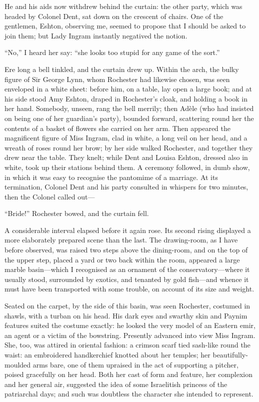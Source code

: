 He and his aids now withdrew behind the curtain: the other party, which
was headed by Colonel Dent, sat down on the crescent of chairs. One of
the gentlemen, \Mr{} Eshton, observing me, seemed to propose that I should
be asked to join them; but Lady Ingram instantly negatived the notion.

\enquote{No,} I heard her say: \enquote{she looks too stupid for any
game of the sort.}

Ere long a bell tinkled, and the curtain drew up. Within the arch, the
bulky figure of Sir George Lynn, whom \Mr{} Rochester had likewise chosen,
was seen enveloped in a white sheet: before him, on a table, lay open a
large book; and at his side stood Amy Eshton, draped in \Mr{} Rochester's
cloak, and holding a book in her hand. Somebody, unseen, rang the bell
merrily; then Adèle (who had insisted on being one of her guardian's
party), bounded forward, scattering round her the contents of a basket
of flowers she carried on her arm. Then appeared the magnificent figure
of Miss Ingram, clad in white, a long veil on her head, and a wreath of
roses round her brow; by her side walked \Mr{} Rochester, and together
they drew near the table. They knelt; while \Mrs{} Dent and Louisa
Eshton, dressed also in white, took up their stations behind them. A
ceremony followed, in dumb show, in which it was easy to recognise the
pantomime of a marriage. At its termination, Colonel Dent and his party
consulted in whispers for two minutes, then the Colonel called out---

\enquote{Bride!} \Mr{} Rochester bowed, and the curtain fell.

A considerable interval elapsed before it again rose. Its second rising
displayed a more elaborately prepared scene than the last. The
drawing-room, as I have before observed, was raised two steps above the
dining-room, and on the top of the upper step, placed a yard or two back
within the room, appeared a large marble basin---which I recognised as
an ornament of the conservatory---where it usually stood, surrounded by
exotics, and tenanted by gold fish---and whence it must have been
transported with some trouble, on account of its size and weight.

Seated on the carpet, by the side of this basin, was seen \Mr{} Rochester,
costumed in shawls, with a turban on his head. His dark eyes and
swarthy skin and Paynim features suited the costume exactly: he looked
the very model of an Eastern emir, an agent or a victim of the
bowstring. Presently advanced into view Miss Ingram. She, too, was
attired in oriental fashion: a crimson scarf tied sash-like round the
waist: an embroidered handkerchief knotted about her temples; her
beautifully-moulded arms bare, one of them upraised in the act of
supporting a pitcher, poised gracefully on her head. Both her cast of
form and feature, her complexion and her general air, suggested the idea
of some Israelitish princess of the patriarchal days; and such was
doubtless the character she intended to represent.

